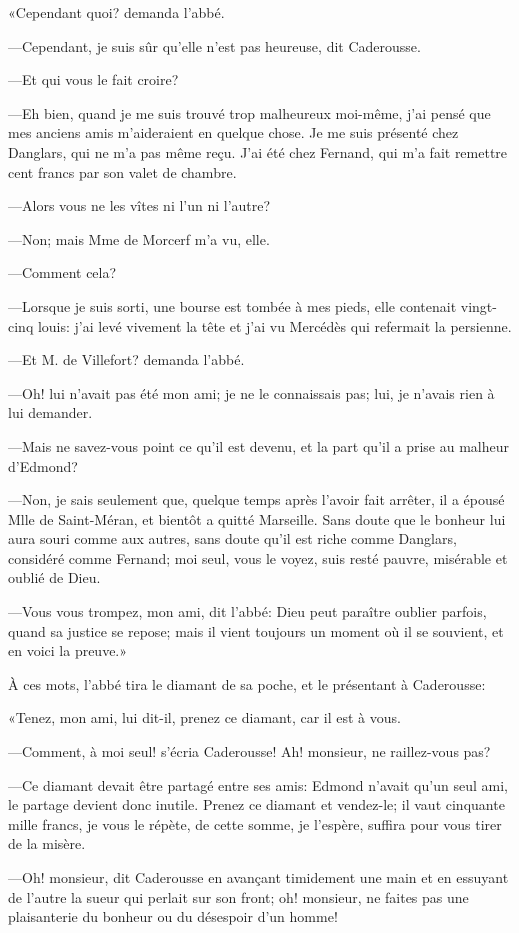 «Cependant quoi? demanda l'abbé.

—Cependant, je suis sûr qu'elle n'est pas heureuse, dit Caderousse.

—Et qui vous le fait croire?

—Eh bien, quand je me suis trouvé trop malheureux moi-même, j'ai pensé que mes anciens amis m'aideraient en quelque chose. Je me suis présenté chez Danglars, qui ne m'a pas même reçu. J'ai été chez Fernand, qui m'a fait remettre cent francs par son valet de chambre.

—Alors vous ne les vîtes ni l'un ni l'autre?

—Non; mais Mme de Morcerf m'a vu, elle.

—Comment cela?

—Lorsque je suis sorti, une bourse est tombée à mes pieds, elle contenait vingt-cinq louis: j'ai levé vivement la tête et j'ai vu Mercédès qui refermait la persienne.

—Et M. de Villefort? demanda l'abbé.

—Oh! lui n'avait pas été mon ami; je ne le connaissais pas; lui, je n'avais rien à lui demander.

—Mais ne savez-vous point ce qu'il est devenu, et la part qu'il a prise au malheur d'Edmond?

—Non, je sais seulement que, quelque temps après l'avoir fait arrêter, il a épousé Mlle de Saint-Méran, et bientôt a quitté Marseille. Sans doute que le bonheur lui aura souri comme aux autres, sans doute qu'il est riche comme Danglars, considéré comme Fernand; moi seul, vous le voyez, suis resté pauvre, misérable et oublié de Dieu.

—Vous vous trompez, mon ami, dit l'abbé: Dieu peut paraître oublier parfois, quand sa justice se repose; mais il vient toujours un moment où il se souvient, et en voici la preuve.»

À ces mots, l'abbé tira le diamant de sa poche, et le présentant à Caderousse:

«Tenez, mon ami, lui dit-il, prenez ce diamant, car il est à vous.

—Comment, à moi seul! s'écria Caderousse! Ah! monsieur, ne raillez-vous pas?

—Ce diamant devait être partagé entre ses amis: Edmond n'avait qu'un seul ami, le partage devient donc inutile. Prenez ce diamant et vendez-le; il vaut cinquante mille francs, je vous le répète, de cette somme, je l'espère, suffira pour vous tirer de la misère.

—Oh! monsieur, dit Caderousse en avançant timidement une main et en essuyant de l'autre la sueur qui perlait sur son front; oh! monsieur, ne faites pas une plaisanterie du bonheur ou du désespoir d'un homme!


